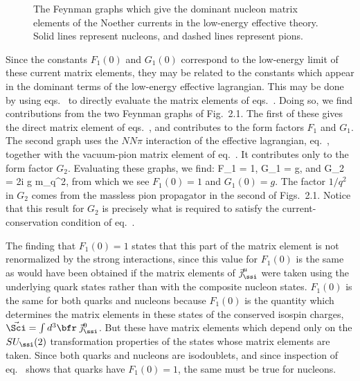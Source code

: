 \documentclass[12pt,epsf]{report}
\begin{document}
\begin{figure}
\vspace{1in}
\caption{The Feynman graphs which give the dominant nucleon
matrix elements of the Noether currents in the low-energy
effective theory. Solid lines represent nucleons, and
dashed lines represent pions.}
\end{figure}


Since the constants $F_1(0)$ and $G_1(0)$ correspond to the
low-energy limit of these current matrix elements, they may
be related to the constants which appear in the dominant
terms of the low-energy effective lagrangian. This may be
done by using 
eqs.~ to directly evaluate the matrix
elements of eqs.~. Doing so, we
find contributions from the two Feynman graphs of Fig.~2.1.
The first of these gives the direct matrix element of
eqs.~, and contributes to the form
factors $F_1$ and $G_1$. The second graph uses the $NN\pi$
interaction of the effective lagrangian,
eq.~, together with the vacuum-pion
matrix element of eq.~. It
contributes only to the form factor $G_2$. Evaluating these
graphs, we find:
%
\eq
\label{formfactorpredictions}
F_1 = 1, \qquad G_1 = g, \qquad \hbox{and} 
\qquad G_2 = {2i g  m_\ssn \over q^2},
\eeq
%
from which we see $F_1(0) = 1$ and $G_1(0) = g$. The factor
$1/q^2$ in $G_2$ comes from the massless pion propagator in
the second of Figs.~2.1. Notice that this result for $G_2$
is precisely what is required to satisfy the
current-conservation condition of
eq.~.

The finding that $F_1(0) = 1$ states that this part of the
matrix element is not renormalized by the strong
interactions, since this value for $F_1(0)$ is the same as
would have been obtained if the matrix elements of
$\vec\jmath^\mu_\ssi$ were taken using the underlying quark
states rather than with the composite nucleon states.
$F_1(0)$ is the same for both quarks and nucleons because
$F_1(0)$ is the quantity which determines the matrix
elements in these states of the conserved isospin charges,
$\vec \Sci = \int 
d^3\bfr \; \vec\jmath^0_\ssi$. But these have matrix
elements which depend only on the $SU_\ssi(2)$
transformation properties of the states whose matrix
elements are taken. Since both quarks and nucleons are
isodoublets, and since inspection of 
eq.~ shows that quarks have $F_1(0) =
1$, the same must be true for nucleons.
\end{document}
